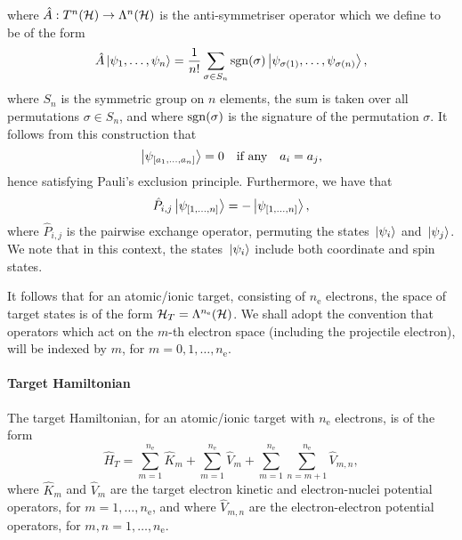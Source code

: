 \documentclass[draft]{article}
\begin{document}
where $\hat{A} : T^{n}(\mathcal{H}) \to \Lambda^{n}(\mathcal{H})$ is the
anti-symmetriser operator which we define to be of the form
\begin{equation}
  \label{eq:anti-symmetriser}
  \hat{A}
  \ket{\psi_{1}, \dotsc, \psi_{n}}
  =
  \dfrac{1}{n!}
  \sum_{\sigma \in S_{n}}
  \mathrm{sgn}(\sigma)
  \ket{\psi_{\sigma(1)}, \dotsc, \psi_{\sigma(n)}}
  ,
\end{equation}
where $S_{n}$ is the symmetric group on $n$ elements, the sum is taken over all
permutations $\sigma \in S_{n}$, and where $\mathrm{sgn}(\sigma)$ is the
signature of the permutation $\sigma$.
It follows from this construction that
\begin{equation}
  \label{eq:anti-symmetry}
  \ket{\psi_{\lrsq{a_{1}, \dotsc, a_{n}}}}
  =
  0
  \qq{if any}
  a_{i} = a_{j}
  ,
\end{equation}
hence satisfying Pauli's exclusion principle.
Furthermore, we have that
\begin{equation}
  \label{eq:pairwise-exchange}
  \hat{P}_{i, j}
  \ket{\psi_{[1, \dotsc, n]}}
  =
  -
  \ket{\psi_{[1, \dotsc, n]}}
  ,
\end{equation}
where $\hat{P}_{i, j}$ is the pairwise exchange operator, permuting the states
$\ket*{\psi_{i}}$ and $\ket*{\psi_{j}}$.
We note that in this context, the states $\ket*{\psi_{i}}$ include both coordinate
and spin states.

It follows that for an atomic/ionic target, consisting of $n_{\mathrm{e}}$
electrons, the space of target states is of the form
$\mathcal{H}_{T} = \Lambda^{n_{\mathrm{e}}}(\mathcal{H})$.
We shall adopt the convention that operators which act on the $m$-th electron
space (including the projectile electron), will be indexed by $m$, for
$m = 0, 1, \dotsc, n_{\mathrm{e}}$.

\paragraph{Target Hamiltonian}
\label{sec:target-hamiltonian}

The target Hamiltonian, for an atomic/ionic target with $n_{\mathrm{e}}$
electrons, is of the form
\begin{equation}
  \label{eq:target-hamiltonian}
  \hat{H}_{T}
  =
  \sum_{m = 1}^{n_{\mathrm{e}}}
  \hat{K}_{m}
  +
  \sum_{m = 1}^{n_{\mathrm{e}}}
  \hat{V}_{m}
  +
  \sum_{m = 1}^{n_{\mathrm{e}}}
  \sum_{n = m + 1}^{n_{\mathrm{e}}}
  \hat{V}_{m, n}
  ,
\end{equation}
where $\hat{K}_{m}$ and $\hat{V}_{m}$ are the target electron kinetic and
electron-nuclei potential operators, for $m = 1, \dotsc, n_{\mathrm{e}}$, and
where $\hat{V}_{m, n}$ are the electron-electron potential operators, for
$m, n = 1, \dotsc, n_{\mathrm{e}}$.
\end{document}
